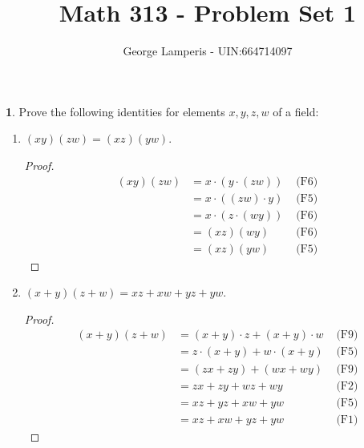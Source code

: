 \documentclass[12pt, letterpaper]{article}
\theoremstyle{definition} %
\newtheorem{problem}[theorem]{}
\begin{document}
\title{Math 313 - Problem Set 1}%
\author{George Lamperis - UIN:664714097} %
\date{}
 
\maketitle

%

\begin{problem}
    Prove the following identities for elements $x,y,z,w$ of a field:

    \begin{enumerate}[label={\bfseries{(\alph{*})}}]
        \item $(xy)(zw)=(xz)(yw)$.
            \begin{proof}
            \begin{align*}
                (xy)(zw) & = x \cdot (y \cdot (zw))  & \text{ (F6)} \\
                         & = x \cdot ((zw) \cdot y)  & \text{ (F5)} \\
                         & = x \cdot (z \cdot (wy))  & \text{ (F6)} \\
                         & = (xz)(wy)                & \text{ (F6)} \\
                         & = (xz)(yw)                & \text{ (F5)}
            \end{align*}    
            \end{proof}

        \item $(x+y)(z+w) = xz+xw+yz+yw$.
            \begin{proof}
            \begin{align*}
                (x+y)(z+w) & = (x+y) \cdot z + (x+y) \cdot w  &\text{ (F9)} \\
                           & = z \cdot (x+y) + w \cdot (x+y)  &\text{ (F5)} \\
                           & = (zx + zy) + (wx + wy)          &\text{ (F9)} \\
                           & = zx + zy + wz + wy              &\text{ (F2)} \\
                           & = xz + yz + xw + yw              &\text{ (F5)} \\
                           & = xz + xw + yz + yw              &\text{ (F1)}   
            \end{align*}
            \end{proof}


\end{enumerate}
\end{problem}
\end{document}
